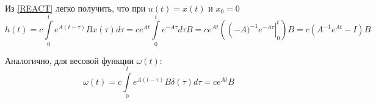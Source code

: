 \documentclass[../../TAU.tex]{subfiles}
\begin{document}

    Из \ref{REACT} легко получить, что при $u(t) = x(t)$ и $x_0 = 0$
    $$
        h(t) = c \int\limits_{0}^{t} e^{A(t-\tau)}Bx(\tau)d\tau = ce^{At} \int\limits_{0}^{t} e^{-A\tau}d\tau B = ce^{At}(\left(-A)^{-1}e^{-A\tau}\right\rvert_0^t)B = c(A^{-1}e^{At}-I)B
    $$

    Аналогично, для весовой функции $\omega(t)$:
    $$
        \omega(t) = c \int\limits_0^t e^{A(t-\tau)}B\delta(\tau)d\tau = ce^{At}B
    $$
\end{document}
